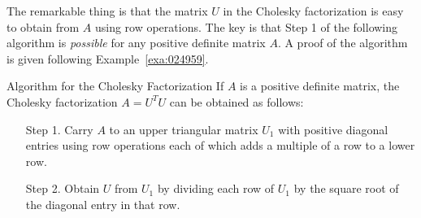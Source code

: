 The remarkable thing is that the matrix $U$ in the Cholesky factorization is easy to obtain from $A$ using row operations. The key is that Step 1 of the following algorithm is \textit{possible} for any positive definite matrix $A$. A proof of the algorithm is given following Example~\ref{exa:024959}.


\begin{theorem*}[label=thm:024947]{Algorithm for the Cholesky Factorization}
If $A$ is a positive definite matrix, the Cholesky factorization $A = U^{T}U$ can be obtained as follows:


\begin{itemize}[leftmargin=4em]
\item[Step 1.] Carry $A$ to an upper triangular matrix $U_{1}$ with positive diagonal entries using row operations each of which adds a multiple of a row to a lower row.

\item[Step 2.] Obtain $U$ from $U_{1}$ by dividing each row of $U_{1}$ by the square root of the diagonal entry in that row.

\end{itemize}
\end{theorem*}

